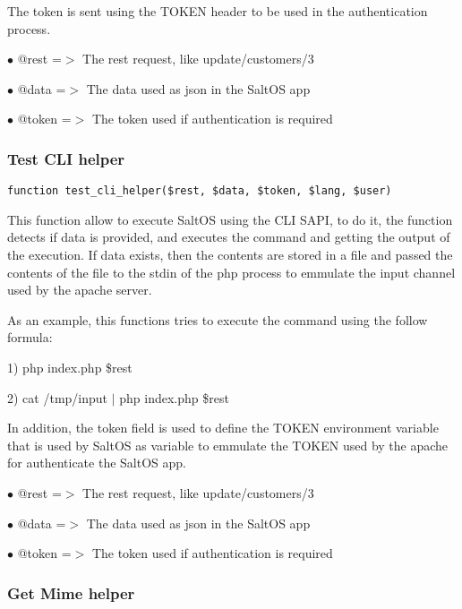 \documentclass[a4paper]{article}
\begin{document}
The token is sent using the TOKEN header to be used in the authentication process.

\begin{compactitem}
\item[\color{myblue}$\bullet$] @rest  =$>$ The rest request, like update/customers/3
\item[\color{myblue}$\bullet$] @data  =$>$ The data used as json in the SaltOS app
\item[\color{myblue}$\bullet$] @token =$>$ The token used if authentication is required
\end{compactitem}

\hypertarget{toc9}{}
\subsubsection{Test CLI helper}

\begin{lstlisting}
function test_cli_helper($rest, $data, $token, $lang, $user)
\end{lstlisting}

This function allow to execute SaltOS using the CLI SAPI, to do it, the function
detects if data is provided, and executes the command and getting the output of
the execution. If data exists, then the contents are stored in a file and passed
the contents of the file to the stdin of the php process to emmulate the input
channel used by the apache server.

As an example, this functions tries to execute the command using the follow formula:

1) php index.php \$rest

2) cat /tmp/input $|$ php index.php \$rest

In addition, the token field is used to define the TOKEN environment variable that
is used by SaltOS as variable to emmulate the TOKEN used by the apache for authenticate
the SaltOS app.

\begin{compactitem}
\item[\color{myblue}$\bullet$] @rest  =$>$ The rest request, like update/customers/3
\item[\color{myblue}$\bullet$] @data  =$>$ The data used as json in the SaltOS app
\item[\color{myblue}$\bullet$] @token =$>$ The token used if authentication is required
\end{compactitem}

\hypertarget{toc10}{}
\subsubsection{Get Mime helper}
\end{document}
